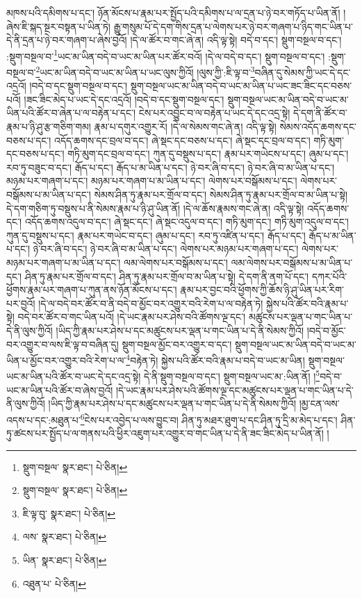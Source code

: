 མཁས་པའི་དམིགས་པ་དང་། ཉོན་མོངས་པ་རྣམ་པར་སྤྱོད་པའི་དམིགས་པ་ལ་དྲན་པ་ཉེ་བར་གཏོད་པ་ཡིན་ནོ། །ཞེས་ཇི་སྐད་སྔར་བསྟན་པ་ཡིན་ཏེ། རྒྱུ་གསུམ་པོ་དེ་དག་གིས་དྲན་པ་ལེགས་པར་ཉེ་བར་གཞག་པ་ཉིད་གང་ཡིན་པ་དེ་ནི་དྲན་པ་ཉེ་བར་གཞག་པ་ཞེས་བྱའོ། །དེ་ལ་ཚོར་བ་གང་ཞེ་ན། འདི་ལྟ་སྟེ། བདེ་བ་དང་། སྡུག་བསྔལ་བ་དང་། :སྡུག་བསྔལ་བ་\footnote{སྡུག་བསྔལ་  སྣར་ཐང་།  པེ་ཅིན། }ཡང་མ་ཡིན་བདེ་བ་ཡང་མ་ཡིན་པར་ཚོར་བའོ། །དེ་ལ་བདེ་བ་དང་། སྡུག་བསྔལ་བ་དང་། :སྡུག་བསྔལ་བ་\footnote{སྡུག་བསྔལ་  སྣར་ཐང་།  པེ་ཅིན། }ཡང་མ་ཡིན་བདེ་བ་ཡང་མ་ཡིན་པ་ཡང་ལུས་ཀྱིའོ། །ལུས་ཀྱི་:ཇི་ལྟ་བ་\footnote{ཇི་ལྟ་བུ་  སྣར་ཐང་།  པེ་ཅིན། }བཞིན་དུ་སེམས་ཀྱི་ཡང་དེ་དང་འདྲའོ། །བདེ་བ་དང་སྡུག་བསྔལ་བ་དང་། སྡུག་བསྔལ་ཡང་མ་ཡིན་བདེ་བ་ཡང་མ་ཡིན་པ་ཡང་ཟང་ཟིང་དང་བཅས་པའོ། །ཟང་ཟིང་མེད་པ་ཡང་དེ་དང་འདྲའོ། །བདེ་བ་དང་སྡུག་བསྔལ་དང་། སྡུག་བསྔལ་ཡང་མ་ཡིན་བདེ་བ་ཡང་མ་ཡིན་པའི་ཚོར་བ་ཞེན་པ་ལ་བརྟེན་པ་དང་། ངེས་པར་འབྱུང་བ་ལ་བརྟེན་པ་ཡང་དེ་དང་འདྲ་སྟེ། དེ་དག་ནི་ཚོར་བ་རྣམ་པ་ཉི་ཤུ་རྩ་གཅིག་གམ། རྣམ་པ་དགུར་འགྱུར་རོ། །དེ་ལ་སེམས་གང་ཞེ་ན། འདི་ལྟ་སྟེ། སེམས་འདོད་ཆགས་དང་བཅས་པ་དང་། འདོད་ཆགས་དང་བྲལ་བ་དང་། ཞེ་སྡང་དང་བཅས་པ་དང་། ཞེ་སྡང་དང་བྲལ་བ་དང་། གཏི་མུག་དང་བཅས་པ་དང་། གཏི་མུག་དང་བྲལ་བ་དང་། ཀུན་དུ་བསྡུས་པ་དང་། རྣམ་པར་གཡེངས་པ་དང་། ཞུམ་པ་དང་། རབ་ཏུ་བཟུང་བ་དང་། རྒོད་པ་དང་། རྒོད་པ་མ་ཡིན་པ་དང་། ཉེ་བར་ཞི་བ་དང་། ཉེ་བར་ཞི་བ་མ་ཡིན་པ་དང་། མཉམ་པར་གཞག་པ་དང་། མཉམ་པར་གཞག་པ་མ་ཡིན་པ་དང་། ལེགས་པར་བསྒོམས་པ་དང་། ལེགས་པར་བསྒོམས་པ་མ་ཡིན་པ་དང་། སེམས་ཤིན་ཏུ་རྣམ་པར་གྲོལ་བ་དང་། སེམས་ཤིན་ཏུ་རྣམ་པར་གྲོལ་བ་མ་ཡིན་པ་སྟེ། དེ་དག་གཅིག་ཏུ་བསྡུས་པ་ནི་སེམས་རྣམ་པ་ཉི་ཤུ་ཡིན་ནོ། །དེ་ལ་ཆོས་རྣམས་གང་ཞེ་ན། འདི་ལྟ་སྟེ། འདོད་ཆགས་དང་། འདོད་ཆགས་འདུལ་བ་དང་། ཞེ་སྡང་དང་། ཞེ་སྡང་འདུལ་བ་དང་། གཏི་མུག་དང་། གཏི་མུག་འདུལ་བ་དང་། ཀུན་དུ་བསྡུས་པ་དང་། རྣམ་པར་གཡེང་བ་དང་། ཞུམ་པ་དང་། རབ་ཏུ་འཛིན་པ་དང་། རྒོད་པ་དང་། རྒོད་པ་མ་ཡིན་པ་དང་། ཉེ་བར་ཞི་བ་དང་། ཉེ་བར་ཞི་བ་མ་ཡིན་པ་དང་། ལེགས་པར་མཉམ་པར་གཞག་པ་དང་། ལེགས་པར་མཉམ་པར་གཞག་པ་མ་ཡིན་པ་དང་། ལམ་ལེགས་པར་བསྒོམས་པ་དང་། ལམ་ལེགས་པར་བསྒོམས་པ་མ་ཡིན་པ་དང་། ཤིན་ཏུ་རྣམ་པར་གྲོལ་བ་དང་། ཤིན་ཏུ་རྣམ་པར་གྲོལ་བ་མ་ཡིན་པ་སྟེ། དེ་དག་ནི་ནག་པོ་དང་། དཀར་པོའི་ཕྱོགས་རྣམ་པར་གཞག་པ་ཀུན་ནས་ཉོན་མོངས་པ་དང་། རྣམ་པར་བྱང་བའི་ཕྱོགས་ཀྱི་ཆོས་ཉི་ཤུ་ཡིན་པར་རིག་པར་བྱའོ། །དེ་ལ་བདེ་བར་ཚོར་བ་ནི་བདེ་བ་མྱོང་བར་འགྱུར་བའི་རེག་པ་ལ་བརྟེན་ཏེ། སྐྱེས་པའི་ཚོར་བའི་རྣམ་པ་སྟེ། བདེ་བར་ཚོར་བ་གང་ཡིན་པའོ། །དེ་ཡང་རྣམ་པར་ཤེས་བའི་ཚོགས་ལྔ་དང་། མཚུངས་པར་ལྡན་པ་གང་ཡིན་པ་དེ་ནི་ལུས་ཀྱིའོ། །ཡིད་ཀྱི་རྣམ་པར་ཤེས་པ་དང་མཚུངས་པར་ལྡན་པ་གང་ཡིན་པ་དེ་ནི་སེམས་ཀྱིའོ། །བདེ་བ་མྱོང་བར་འགྱུར་བ་ལས་ཇི་ལྟ་བ་བཞིན་དུ། སྡུག་བསྔལ་མྱོང་བར་འགྱུར་བ་དང་། སྡུག་བསྔལ་ཡང་མ་ཡིན་བདེ་བ་ཡང་མ་ཡིན་པ་མྱོང་བར་འགྱུར་བའི་རེག་པ་ལ་\footnote{ལས་  སྣར་ཐང་།  པེ་ཅིན། }བརྟེན་ཏེ། སྐྱེས་པའི་ཚོར་བའི་རྣམ་པ་བདེ་བ་ཡང་མ་ཡིན། སྡུག་བསྔལ་ཡང་མ་ཡིན་པའི་ཚོར་བ་ཡང་དེ་དང་འདྲ་སྟེ། དེ་ནི་སྡུག་བསྔལ་བ་དང་། སྡུག་བསྔལ་ཡང་མ་:ཡིན་ནོ། །\footnote{ཡིན་  སྣར་ཐང་།  པེ་ཅིན། }བདེ་བ་ཡང་མ་ཡིན་པའི་ཚོར་བ་ཞེས་བྱའོ། །དེ་ཡང་རྣམ་པར་ཤེས་པའི་ཚོགས་ལྔ་དང་མཚུངས་པར་ལྡན་པ་གང་ཡིན་པ་དེ་ནི་ལུས་ཀྱིའོ། །ཡིད་ཀྱི་རྣམ་པར་ཤེས་པ་དང་མཚུངས་པར་ལྡན་པ་གང་ཡིན་པ་དེ་ནི་སེམས་ཀྱིའོ། །མྱ་ངན་ལས་འདས་པ་དང་:མཐུན་པ་\footnote{འཐུན་པ་  པེ་ཅིན། }ངེས་པར་འབྱེད་པ་ལས་བྱུང་བ། ཤིན་ཏུ་མཐར་ཐུག་པ་དང་ཤིན་ཏུ་དྲི་མ་མེད་པ་དང་། ཤིན་ཏུ་ཚངས་པར་སྤྱོད་པ་ལ་གནས་པའི་ཕྱིར་འཇུག་པར་འགྱུར་བ་གང་ཡིན་པ་དེ་ནི་ཟང་ཟིང་མེད་པ་ཡིན་ནོ། །
